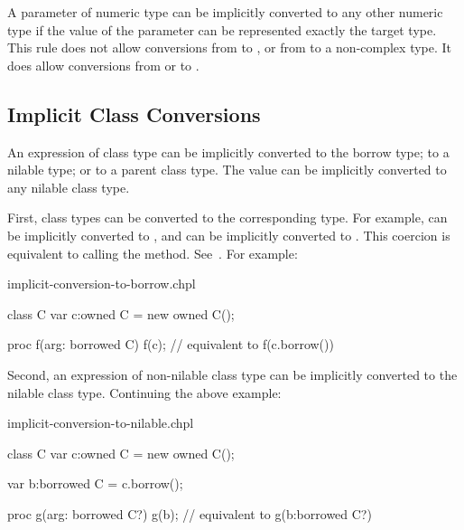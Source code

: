 A parameter of numeric type can be implicitly converted to any other
numeric type if the value of the parameter can be represented exactly
the target type. This rule does not allow conversions from  to
, or from  to a non-complex type. It does allow
conversions from  or  to .

\subsection{Implicit Class Conversions}
\label{Implicit_Class_Conversions}

An expression of class type can be implicitly converted to the borrow type;
to a nilable type; or to a parent class type. The value  can be
implicitly converted to any nilable class type.

First, class types can be converted to the corresponding 
type. For example,  can be implicitly converted to
, and  can be implicitly converted to
. This coercion is equivalent to calling the
 method.  See~. For
example:

\begin{chapelexample}{implicit-conversion-to-borrow.chpl}
\begin{chapel}
class C { }
var c:owned C = new owned C();

proc f(arg: borrowed C) { }
f(c); // equivalent to f(c.borrow())
\end{chapel}
\begin{chapeloutput}
\end{chapeloutput}
\end{chapelexample}

Second, an expression of non-nilable class type can be implicitly
converted to the nilable class type. Continuing the above
example:

\begin{chapelexample}{implicit-conversion-to-nilable.chpl}
\begin{chapelpre}
class C { }
var c:owned C = new owned C();
\end{chapelpre}
\begin{chapel}
var b:borrowed C = c.borrow();

proc g(arg: borrowed C?) { }
g(b); // equivalent to g(b:borrowed C?)
\end{chapel}
\begin{chapeloutput}
\end{chapeloutput}
\end{chapelexample}

